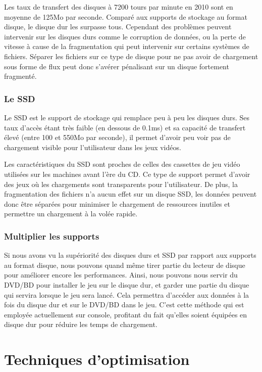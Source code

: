 \documentclass[a4paper, 11pt]{article} %
\begin{document}
Les taux de transfert des disques à 7200 tours par minute en 2010 sont en moyenne de 125Mo par seconde. Comparé aux supports de stockage au format disque, le disque dur les surpasse tous. Cependant des problèmes peuvent intervenir sur les disques durs comme le corruption de données, ou la perte de vitesse à cause de la fragmentation qui peut intervenir sur certains systèmes de fichiers. Séparer les fichiers sur ce type de disque pour ne pas avoir de chargement sous forme de flux peut donc s'avérer pénalisant sur un disque fortement fragmenté.

\newpage
\subsubsection*{Le SSD}
Le SSD est le support de stockage qui remplace peu à peu les disques durs. Ses taux d'accès étant très faible (en dessous de 0.1ms) et sa capacité de transfert élevé (entre 100 et 550Mo par seconde)\cite{hardware:ssdspeed}, il permet d'avoir peu voir pas de chargement visible pour l'utilisateur dans les jeux vidéos. 

Les caractéristiques du SSD sont proches de celles des cassettes de jeu vidéo utilisées sur les machines avant l'ère du CD. Ce type de support permet d'avoir des jeux où les chargements sont transparents pour l'utilisateur. De plus, la fragmentation des fichiers n'a aucun effet sur un disque SSD, les données peuvent donc être séparées pour minimiser le chargement de ressources inutiles et permettre un chargement à la volée rapide.

\subsubsection*{Multiplier les supports}
Si nous avons vu la supériorité des disques durs et SSD par rapport aux supports au format disque, nous pouvons quand même tirer partie du lecteur de disque pour améliorer encore les performances. Ainsi, nous pouvons nous servir du DVD/BD pour installer le jeu sur le disque dur, et garder une partie du disque qui servira lorsque le jeu sera lancé. Cela permettra d'accéder aux données à la fois du disque dur et sur le DVD/BD dans le jeu. C'est cette méthode qui est employée actuellement sur console, profitant du fait qu'elles soient équipées en disque dur pour réduire les temps de chargement.

\newpage
\section*{Techniques d'optimisation}
\end{document}

